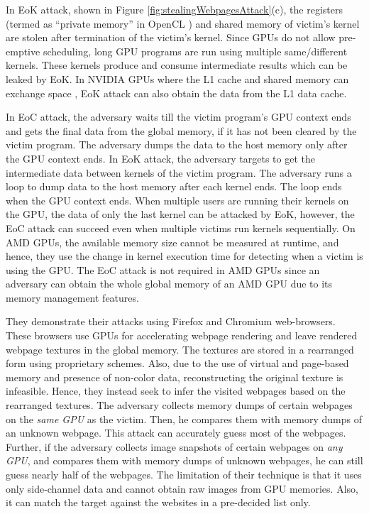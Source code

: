 In EoK attack, shown in Figure \ref{fig:stealingWebpagesAttack}(c), the registers (termed as ``private memory'' in OpenCL \cite{opencl_nvidiagpu})  and shared memory of victim's kernel are stolen after termination of the victim's kernel.  Since GPUs do not allow pre-emptive scheduling, long GPU programs are run using multiple same/different kernels. These kernels produce and consume intermediate results which can be leaked by EoK. In NVIDIA GPUs where the L1 cache and shared memory can exchange space \cite{harris2013sharedmemory}, EoK attack can also obtain the data from the L1 data cache. 

In EoC attack, the adversary waits till the victim program's GPU context ends and gets the final data from the global memory, if it has not been cleared by the victim program. The adversary dumps the data to the host memory only after the GPU context ends.
In EoK attack, the adversary targets to get the intermediate data between kernels of the victim program. The adversary runs a loop to dump data to the host memory after each kernel ends. The loop ends when the GPU context ends.
When multiple users are running their kernels on the GPU, the data of only the last kernel can be attacked by EoK, however, the EoC attack can succeed even when multiple victims run kernels sequentially. On AMD GPUs, the available memory size cannot be measured at runtime, and hence, they use the change in kernel execution time for detecting when a victim is using the GPU. The EoC attack is not required in AMD GPUs since an adversary can obtain the whole global memory of an AMD GPU due to its memory management features. 

They demonstrate their attacks using Firefox and Chromium web-browsers. These browsers use GPUs for accelerating webpage rendering and leave rendered webpage textures in the global memory. The textures are stored in a rearranged form using proprietary schemes. Also, due to the use of virtual and page-based memory and presence of non-color data, reconstructing the original texture is infeasible. Hence, they instead seek to infer the visited webpages based on the rearranged textures. The adversary collects memory dumps of certain webpages on the \textit{same GPU} as the victim. Then, he compares them with memory dumps of an unknown webpage. This attack can accurately guess most of the webpages. Further, if the adversary collects image snapshots of certain webpages on \textit{any GPU}, and compares them with memory dumps of unknown webpages, he can still guess nearly half of the webpages. The limitation of their technique is that it uses only side-channel data and cannot obtain raw images from GPU memories. Also, it can match the target against the websites in  a pre-decided list only. 

